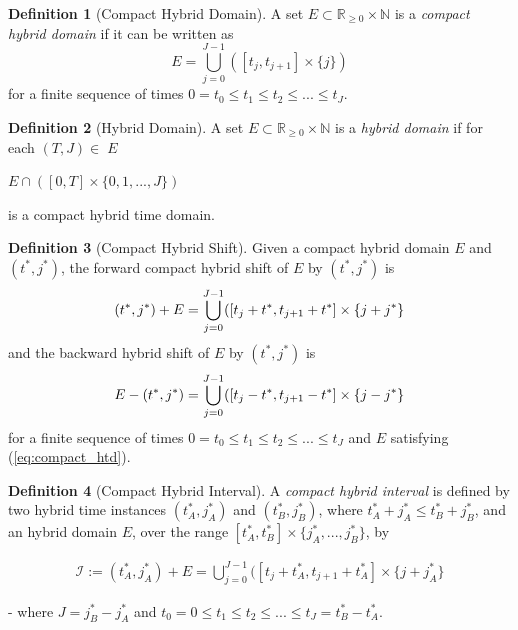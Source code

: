 \documentclass{article}
\theoremstyle{definition}
\newtheorem{definition}{Definition}[section]
\begin{document}
\begin{definition}[Compact Hybrid Domain] A set $E \subset
    \mathbb{R}_{\geq0} \times \mathbb{N}$ is a  \textit{compact hybrid
    domain} if it can be written as
\begin{equation}
    \label{eq:compact_htd}
    E = \bigcup\limits_{j=0}^{J-1} ([t_j,t_{j+1}] \times \{j\})
\end{equation}
for a finite sequence of times $0 = t_0 \leq t_1 \leq t_2 \leq ... \leq t_J$.
\end{definition}

\begin{definition}[Hybrid Domain]
A set $E \subset \mathbb{R}_{\geq0} \times \mathbb{N}$ is a \textit{hybrid  domain} if for each $(T,J)\in\;E$
\begin{center}
    $E \cap ([0,T] \times \{0,1,...,J\})$
\end{center} 
is a compact hybrid time domain.
\end{definition}

\begin{definition}[Compact Hybrid Shift] Given a compact hybrid domain $E$
    and $(t^*,j^*)$, the forward {compact hybrid shift} of $E$ by $(t^*,j^*)$ is
\begin{equation}
    (t^*,j^*) + E = \bigcup\limits_{j=0}^{J-1} ([t_j + t^*,t_{j+1}+t^*] \times \{j+j^*\}\quad\\
\end{equation}
and the backward hybrid shift of $E$ by $(t^*,j^*)$ is
\begin{equation}
    E - (t^*,j^*) = \bigcup\limits_{j=0}^{J-1} ([t_j - t^*,t_{j+1}-t^*] \times \{j-j^*\}\\
\end{equation}
for a finite sequence of times $0 = t_0 \leq t_1 \leq t_2 \leq ... \leq t_J$
and $E$ satisfying (\ref{eq:compact_htd}).
\end{definition}

\begin{definition}[Compact Hybrid Interval] A \textit{compact hybrid
    interval} is defined by two hybrid time instances $(t^*_A,j^*_A)$ and
    $(t^*_B,j^*_B)$, where $t^*_A + j^*_A \leq t^*_B + j^*_B$, and an hybrid domain $E$, over the range $[t^*_A,
    t^*_B]\times\{j^*_A,..., j^*_B\}$, by

\begin{gather}
    \mathcal{I} := (t^*_A,j^*_A) + E = \bigcup\limits_{j=0}^{J-1} ([t_j + t^*_A,t_{j+1} + t^*_A] \times \{j + j^*_A\}
\end{gather}

- where $J = j^*_B - j^*_A$ and $t_0 = 0 \leq t_1 \leq t_2 \leq ... \leq t_J =
t^*_B - t^*_A$.
\end{definition}
\end{document}
